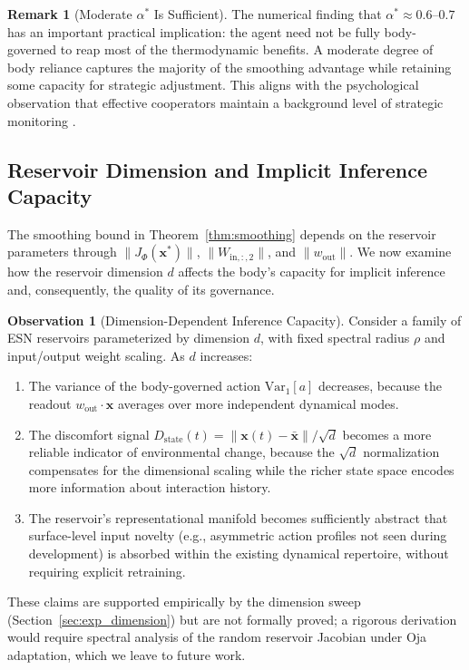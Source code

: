 \documentclass[11pt,a4paper]{article}
\theoremstyle{definition}
\newtheorem{remark}[theorem]{Remark}
\newtheorem{observation}[theorem]{Observation}
\newcommand{\Var}{\mathrm{Var}}
\newcommand{\Wout}{w_{\mathrm{out}}}
\newcommand{\xstate}{\mathbf{x}}
\begin{document}
\begin{remark}[Moderate $\alpha^{*}$ Is Sufficient]
The numerical finding that $\alpha^{*} \approx 0.6$--$0.7$ has an important
practical implication: the agent need not be fully body-governed to reap
most of the thermodynamic benefits.  A moderate degree of body reliance
captures the majority of the smoothing advantage while retaining some
capacity for strategic adjustment.  This aligns with the psychological
observation that effective cooperators maintain a background level of
strategic monitoring \citep{dolan2013}.
\end{remark}

\subsection{Reservoir Dimension and Implicit Inference Capacity}
\label{sec:dimension_smoothing}

The smoothing bound in Theorem~\ref{thm:smoothing} depends on the reservoir
parameters through $\|J_{\Phi}(\xstate^{*})\|$, $\|W_{\mathrm{in},{:,2}}\|$, and $\|\Wout\|$.
We now examine how the reservoir dimension $d$ affects the body's capacity
for implicit inference and, consequently, the quality of its governance.

\begin{observation}[Dimension-Dependent Inference Capacity]
\label{prop:dimension_smoothing}
Consider a family of ESN reservoirs parameterized by dimension $d$, with
fixed spectral radius $\rho$ and input/output weight scaling.
As $d$ increases:
\begin{enumerate}[label=(\alph*)]
  \item The variance of the body-governed action $\Var_1[a]$ decreases,
    because the readout $\Wout \cdot \xstate$ averages over more independent
    dynamical modes.
  \item The discomfort signal $D_{\mathrm{state}}(t) = \|\xstate(t) - \bar{\xstate}\| / \sqrt{d}$
    becomes a more reliable indicator of environmental change, because
    the $\sqrt{d}$ normalization compensates for the dimensional scaling
    while the richer state space encodes more information about interaction
    history.
  \item The reservoir's representational manifold becomes sufficiently
    abstract that surface-level input novelty (e.g., asymmetric action
    profiles not seen during development) is absorbed within the existing
    dynamical repertoire, without requiring explicit retraining.
\end{enumerate}
These claims are supported empirically by the dimension sweep
(Section~\ref{sec:exp_dimension}) but are not formally proved; a rigorous
derivation would require spectral analysis of the random reservoir Jacobian
under Oja adaptation, which we leave to future work.
\end{observation}
\end{document}
